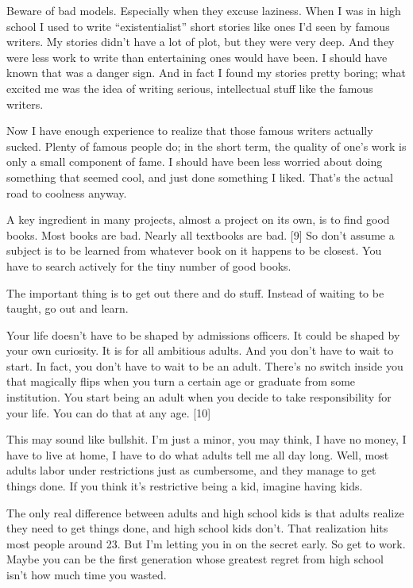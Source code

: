 Beware of bad models. Especially when they excuse laziness. When I was
in high school I used to write ``existentialist'' short stories like
ones I'd seen by famous writers. My stories didn't have a lot of plot,
but they were very deep. And they were less work to write than
entertaining ones would have been. I should have known that was a danger
sign. And in fact I found my stories pretty boring; what excited me was
the idea of writing serious, intellectual stuff like the famous writers.

Now I have enough experience to realize that those famous writers
actually sucked. Plenty of famous people do; in the short term, the
quality of one's work is only a small component of fame. I should have
been less worried about doing something that seemed cool, and just done
something I liked. That's the actual road to coolness anyway.

A key ingredient in many projects, almost a project on its own, is to
find good books. Most books are bad. Nearly all textbooks are bad.
{[}9{]} So don't assume a subject is to be learned from whatever book on
it happens to be closest. You have to search actively for the tiny
number of good books.

The important thing is to get out there and do stuff. Instead of waiting
to be taught, go out and learn.

Your life doesn't have to be shaped by admissions officers. It could be
shaped by your own curiosity. It is for all ambitious adults. And you
don't have to wait to start. In fact, you don't have to wait to be an
adult. There's no switch inside you that magically flips when you turn a
certain age or graduate from some institution. You start being an adult
when you decide to take responsibility for your life. You can do that at
any age. {[}10{]}

This may sound like bullshit. I'm just a minor, you may think, I have no
money, I have to live at home, I have to do what adults tell me all day
long. Well, most adults labor under restrictions just as cumbersome, and
they manage to get things done. If you think it's restrictive being a
kid, imagine having kids.

The only real difference between adults and high school kids is that
adults realize they need to get things done, and high school kids don't.
That realization hits most people around 23. But I'm letting you in on
the secret early. So get to work. Maybe you can be the first generation
whose greatest regret from high school isn't how much time you wasted.

